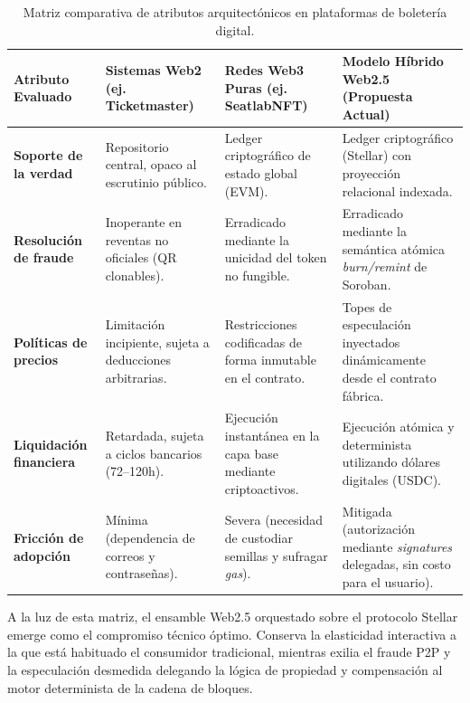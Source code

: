 \begin{table}[H]
\centering
\small
\renewcommand{\arraystretch}{1.3}
\caption{Matriz comparativa de atributos arquitectónicos en plataformas de boletería digital.}
\label{tab:comparativa-estado-arte}
\begin{tabularx}{\textwidth}{>{\raggedright\arraybackslash}p{3.5cm} >{\raggedright\arraybackslash}p{3.8cm}
>{\raggedright\arraybackslash}p{3.8cm} >{\raggedright\arraybackslash}X}
\toprule
\rowcolor{rowgray}
\textbf{Atributo Evaluado} & \textbf{Sistemas Web2 (ej. Ticketmaster)} & \textbf{Redes Web3 Puras (ej.
SeatlabNFT)} & \textbf{Modelo Híbrido Web2.5 (Propuesta Actual)} \\
\midrule
\textbf{Soporte de la verdad} & Repositorio central, opaco al escrutinio público. & Ledger criptográfico de
estado global (EVM). & Ledger criptográfico (Stellar) con proyección relacional indexada. \\
\rowcolor{rowgray}
\textbf{Resolución de fraude} & Inoperante en reventas no oficiales (QR clonables). & Erradicado mediante la
unicidad del token no fungible. & Erradicado mediante la semántica atómica \textit{burn/remint} de Soroban. \\
\textbf{Políticas de precios} & Limitación incipiente, sujeta a deducciones arbitrarias. & Restricciones
codificadas de forma inmutable en el contrato. & Topes de especulación inyectados dinámicamente desde el
contrato fábrica. \\
\rowcolor{rowgray}
\textbf{Liquidación financiera} & Retardada, sujeta a ciclos bancarios (72--120h). & Ejecución instantánea en
la capa base mediante criptoactivos. & Ejecución atómica y determinista utilizando dólares digitales (USDC).
\\
\textbf{Fricción de adopción} & Mínima (dependencia de correos y contraseñas). & Severa (necesidad de
custodiar semillas y sufragar \textit{gas}). & Mitigada (autorización mediante \textit{signatures} delegadas,
sin costo para el usuario). \\
\bottomrule
\end{tabularx}
\end{table}

A la luz de esta matriz, el ensamble Web2.5 orquestado sobre el protocolo Stellar emerge como el compromiso
técnico óptimo. Conserva la elasticidad interactiva a la que está habituado el consumidor tradicional,
mientras exilia el fraude P2P y la especulación desmedida delegando la lógica de propiedad y compensación al
motor determinista de la cadena de bloques.

